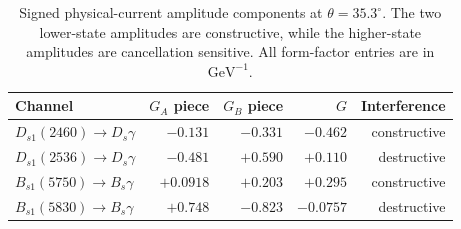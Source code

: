 \begin{table}[t]
\centering
\caption{Signed physical-current amplitude components at $\theta=35.3^\circ$.
The two lower-state amplitudes are constructive, while the higher-state
amplitudes are cancellation sensitive.  All form-factor entries are in
$\mathrm{GeV}^{-1}$.}
\label{tab:amplitude-decomposition}
\begin{tabular}{lrrrr}
\hline
Channel & $G_A$ piece & $G_B$ piece & $G$ & Interference \\
\hline
$D_{s1}(2460)\to D_s\gamma$ & $-0.131$ & $-0.331$ & $-0.462$ & constructive \\
$D_{s1}(2536)\to D_s\gamma$ & $-0.481$ & $+0.590$ & $+0.110$ & destructive \\
$B_{s1}(5750)\to B_s\gamma$ & $+0.0918$ & $+0.203$ & $+0.295$ & constructive \\
$B_{s1}(5830)\to B_s\gamma$ & $+0.748$ & $-0.823$ & $-0.0757$ & destructive \\
\hline
\end{tabular}
\end{table}
